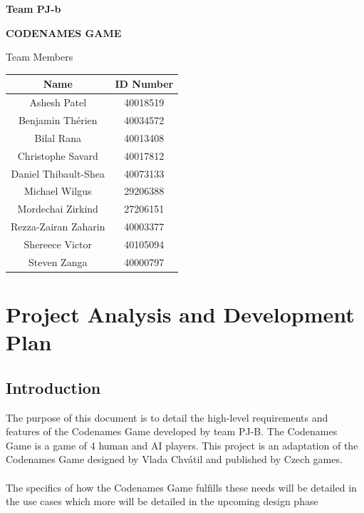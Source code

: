 \documentclass[10pt, a4paper]{article}
\begin{document}
	
\hrulefill
\begin{flushright}
\textbf{Team PJ-b}
\end{flushright}
\hrulefill

\vspace*{0.5in}
\centerline{\bf\Large CODENAMES GAME}

\vspace*{1.5in}


\begin{table}[htbp] 
\begin{center} 
	\begin{center} 
		Team Members\\
		
	\end{center} 
	\begin{tabular}{| c | c |} 
		\hline 
		Name & ID Number \\ 
		\hline\hline 
		Ashesh Patel & 40018519 \\ 
		Benjamin Th\'erien & 40034572\\ 
		Bilal Rana & 40013408 \\
		Christophe Savard & 40017812\\
		Daniel Thibault-Shea & 40073133\\ 
		Michael Wilgus & 29206388 \\ 
		Mordechai Zirkind & 27206151\\
		Rezza-Zairan Zaharin & 40003377 \\
		Shereece Victor & 40105094\\ 
		Steven Zanga & 40000797\\ 
		 
		\hline 
	\end{tabular} 
\end{center} 
\end{table} 

\newpage 
\tableofcontents 
\newpage 

\section{Project Analysis and Development Plan}

	\subsection{Introduction}
	
	 The purpose of this document is to detail the high-level requirements and features of the Codenames Game developed by team PJ-B. The Codenames Game is a game of 4 human and AI players. This project is an adaptation of the Codenames Game designed by Vlada Chv\'atil and published by Czech games.\\
	 \\
	 The specifics of how the Codenames Game fulfills these needs will be detailed in the use cases which more will be detailed in the upcoming design phase\\
	
\end{document}
